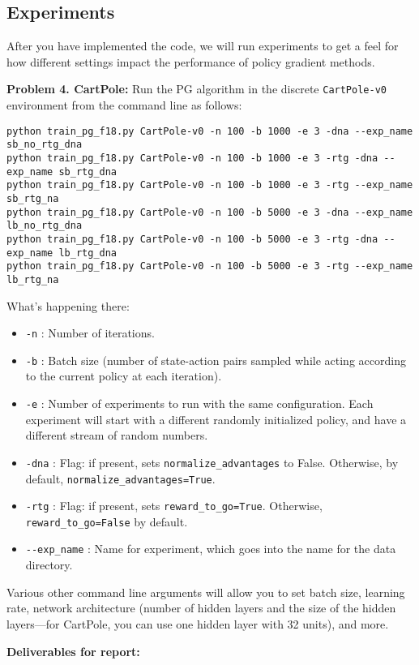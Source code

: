 \documentclass[12pt]{article}
\begin{document}
\subsection{Experiments}
After you have implemented the code, we will run experiments to get a feel for how different settings impact the performance of policy gradient methods.

\textbf{Problem 4. CartPole:} Run the PG algorithm in the discrete \verb|CartPole-v0| environment from the command line as follows:
\begin{lstlisting}
python train_pg_f18.py CartPole-v0 -n 100 -b 1000 -e 3 -dna --exp_name sb_no_rtg_dna
python train_pg_f18.py CartPole-v0 -n 100 -b 1000 -e 3 -rtg -dna --exp_name sb_rtg_dna
python train_pg_f18.py CartPole-v0 -n 100 -b 1000 -e 3 -rtg --exp_name sb_rtg_na
python train_pg_f18.py CartPole-v0 -n 100 -b 5000 -e 3 -dna --exp_name lb_no_rtg_dna
python train_pg_f18.py CartPole-v0 -n 100 -b 5000 -e 3 -rtg -dna --exp_name lb_rtg_dna
python train_pg_f18.py CartPole-v0 -n 100 -b 5000 -e 3 -rtg --exp_name lb_rtg_na
\end{lstlisting}

What's happening there:
\begin{itemize}
\item \verb|-n| : Number of iterations.
\item \verb|-b| : Batch size (number of state-action pairs sampled while acting according to the current policy at each iteration).
\item \verb|-e| : Number of experiments to run with the same configuration. Each experiment will start with a different randomly initialized policy, and have a different stream of random numbers. 
\item \verb|-dna| : Flag: if present, sets \verb|normalize_advantages| to False. Otherwise, by default, \verb|normalize_advantages=True|.
\item \verb|-rtg| : Flag: if present, sets \verb|reward_to_go=True|. Otherwise, \verb|reward_to_go=False| by default. 
\item \verb|--exp_name| : Name for experiment, which goes into the name for the data directory.
\end{itemize}

Various other command line arguments will allow you to set batch size, learning rate, network architecture (number of hidden layers and the size of the hidden layers---for CartPole, you can use one hidden layer with 32 units), and more. 

\textbf{Deliverables for report:}
\end{document}
